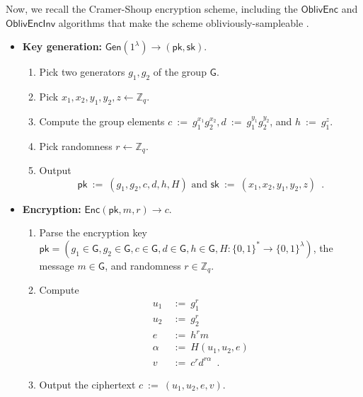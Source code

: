 \documentclass[11pt,letterpaper]{article}
\theoremstyle{plain} %
\theoremstyle{definition} %
\theoremstyle{remark} %
\newcommand{\eqdef}{\ {:=} \ }
\newcommand{\SecParam}{\lambda}
\newcommand{\Gen}{\mathsf{Gen}}
\newcommand{\Enc}{\mathsf{Enc}}
\newcommand{\OblivEnc}{\mathsf{OblivEnc}}
\newcommand{\OblivEncInv}{\mathsf{OblivEncInv}}
\newcommand{\EncKey}{\mathsf{pk}}
\newcommand{\DecKey}{\mathsf{sk}}
\newcommand{\Msg}{m}
\newcommand{\Ciphertext}{c}
\newcommand{\Rand}{r}
\newcommand{\Bits}{\{0,1\}}
\newcommand{\Integers}{\mathbb{Z}}
\newcommand{\Group}{\mathsf{G}}
\newcommand{\GrpOrd}{q}
\newcommand{\GrpEltC}{c}
\newcommand{\GrpEltD}{d}
\newcommand{\GrpEltE}{e}
\newcommand{\GrpEltH}{h}
\newcommand{\GrpEltU}{u}
\newcommand{\GrpEltV}{v}
\newcommand{\Generator}{g}
\newcommand{\Hash}{H}
\newcommand{\ExpX}{x}
\newcommand{\ExpY}{y}
\newcommand{\ExpZ}{z}
\newcommand{\Tag}{\alpha}
\begin{document}
Now, we recall the Cramer-Shoup encryption scheme, including the $\OblivEnc$ and $\OblivEncInv$ algorithms that make the scheme obliviously-sampleable \cite{CanettiF01}.
\begin{itemize}[nolistsep]
    \item \textbf{Key generation:} $\Gen(1^{\SecParam}) \to (\EncKey, \DecKey)$.
    \begin{enumerate}[nolistsep]
        \item Pick two generators $\Generator_1, \Generator_2$ of the group $\Group$.
        \item Pick $\ExpX_1, \ExpX_2, \ExpY_1, \ExpY_2, \ExpZ \gets \Integers_{\GrpOrd}$.
        \item Compute the group elements $\GrpEltC \eqdef \Generator_1^{\ExpX_1}\Generator_2^{\ExpX_2}, \GrpEltD \eqdef \Generator_1^{\ExpY_1}\Generator_2^{\ExpY_2}$, and $\GrpEltH \eqdef \Generator_1^{\ExpZ}$.
        \item Pick randomness $\Rand \gets \Integers_{\GrpOrd}$.
        \item Output
        \begin{equation*}
            \EncKey \eqdef (\Generator_1, \Generator_2, \GrpEltC, \GrpEltD, \GrpEltH, \Hash)
            \textrm{ and }
            \DecKey \eqdef (\ExpX_1, \ExpX_2, \ExpY_1, \ExpY_2, \ExpZ)
            \enspace.
        \end{equation*}
    \end{enumerate}

    \item \textbf{Encryption:} $\Enc(\EncKey, \Msg, \Rand) \to \Ciphertext$.
    \begin{enumerate}[nolistsep]
        \item Parse the encryption key $\EncKey = (\Generator_1 \in \Group, \Generator_2 \in \Group, \GrpEltC\in \Group, \GrpEltD\in \Group, \GrpEltH\in \Group, \Hash \colon \Bits^{*} \to \Bits^{\SecParam})$, the message $\Msg \in \Group$, and randomness $\Rand \in \Integers_{\GrpOrd}$.
        \item Compute
        \begin{align*}
            \GrpEltU_1 &\eqdef \Generator_1^{\Rand}\\
            \GrpEltU_2 &\eqdef \Generator_2^{\Rand}\\
            \GrpEltE &\eqdef \GrpEltH^{\Rand}\Msg\\
            \Tag &\eqdef \Hash(\GrpEltU_1, \GrpEltU_2, \GrpEltE)\\
            \GrpEltV &\eqdef \GrpEltC^{\Rand}\GrpEltD^{\Rand\Tag}
            \enspace.
        \end{align*}
        \item Output the ciphertext $\Ciphertext \eqdef (\GrpEltU_1, \GrpEltU_2, \GrpEltE, \GrpEltV)$.
    \end{enumerate}


\end{itemize}
\end{document}
